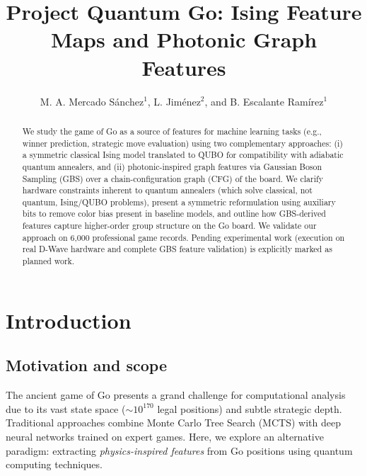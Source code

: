 \documentclass[aps,prl,reprint]{revtex4-2}
\begin{document}
	
\title{Project Quantum Go: Ising Feature Maps and Photonic Graph Features}

\author{M. A. Mercado Sánchez$^{1}$, L. Jiménez$^{2}$, and B. Escalante Ramírez$^{1}$}


\begin{abstract}
We study the game of Go as a source of features for machine learning tasks (e.g., winner prediction, strategic move evaluation) using two complementary approaches: (i) a symmetric classical Ising model translated to QUBO for compatibility with adiabatic quantum annealers, and (ii) photonic-inspired graph features via Gaussian Boson Sampling (GBS) over a chain-configuration graph (CFG) of the board. We clarify hardware constraints inherent to quantum annealers (which solve classical, not quantum, Ising/QUBO problems), present a symmetric reformulation using auxiliary bits to remove color bias present in baseline models, and outline how GBS-derived features capture higher-order group structure on the Go board. We validate our approach on 6,000 professional game records. Pending experimental work (execution on real D-Wave hardware and complete GBS feature validation) is explicitly marked as planned work.
\end{abstract}

\maketitle

\section{Introduction}

\subsection{Motivation and scope}

The ancient game of Go presents a grand challenge for computational analysis due to its vast state space ($\sim 10^{170}$ legal positions) and subtle strategic depth. Traditional approaches combine Monte Carlo Tree Search (MCTS) with deep neural networks trained on expert games. Here, we explore an alternative paradigm: extracting \textit{physics-inspired features} from Go positions using quantum computing techniques.
\end{document}
